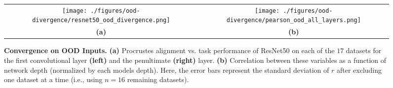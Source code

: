 
\begin{figure*}[htbp!]
    \begin{tabular}{cc}
      \texttt{[image: ./figures/ood-divergence/resnet50\_ood\_divergence.png]} & \texttt{[image: ./figures/ood-divergence/pearson\_ood\_all\_layers.png]}\\
    \textbf{(a)} & \textbf{(b)} 
    \end{tabular}
    \caption{\textbf{Convergence on OOD Inputs.} \textbf{(a)} Procrustes alignment vs. task performance of ResNet50 on each of the $17$ datasets for the first convolutional layer \textbf{(left)} and the penultimate \textbf{(right)} layer. \textbf{(b)} Correlation between these variables as a function of network depth (normalized by each models depth). Here, the error bars represent the standard deviation of $r$ after excluding one dataset at a time (i.e., using $n=16$ remaining datasets).}
    \label{fig: ood-convergence}
\end{figure*}    